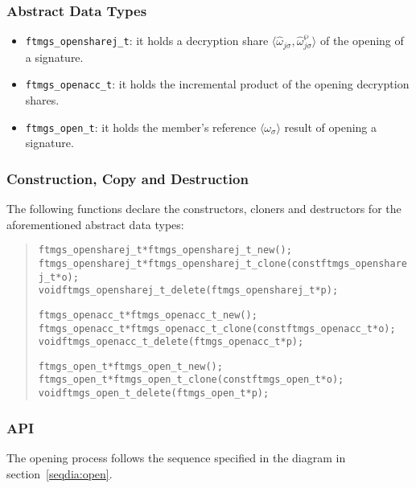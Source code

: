 \documentclass[a4paper]{article}
\newenvironment{code}%
{\begin{quote}\footnotesize\begin{alltt}}%
{\end{alltt}\end{quote}}%
\newcommand{\tuple}[1]{\ensuremath{\langle #1 \rangle}}
\begin{document}
\subsubsection*{Abstract Data Types}
\begin{itemize}\small
\item \verb|ftmgs_opensharej_t|: it holds a decryption share
  \tuple{\hat{\omega}_{j\sigma},\hat{\omega}^{\wp}_{j\sigma}} of the
  opening of a signature.
\item \verb|ftmgs_openacc_t|: it holds the incremental product of the
  opening decryption shares.
\item \verb|ftmgs_open_t|: it holds the member's reference
  \tuple{\omega_{\sigma}} result of opening a signature.
\end{itemize}
\subsubsection*{Construction, Copy and Destruction}
The following functions declare the constructors, cloners and destructors
for the aforementioned abstract data types:
\begin{code}
ftmgs_opensharej_t* ftmgs_opensharej_t_new();
ftmgs_opensharej_t* ftmgs_opensharej_t_clone(const ftmgs_opensharej_t* o);
void ftmgs_opensharej_t_delete(ftmgs_opensharej_t* p);

ftmgs_openacc_t* ftmgs_openacc_t_new();
ftmgs_openacc_t* ftmgs_openacc_t_clone(const ftmgs_openacc_t* o);
void ftmgs_openacc_t_delete(ftmgs_openacc_t* p);

ftmgs_open_t* ftmgs_open_t_new();
ftmgs_open_t* ftmgs_open_t_clone(const ftmgs_open_t* o);
void ftmgs_open_t_delete(ftmgs_open_t* p);
\end{code}
\subsubsection*{API}
The opening process follows the sequence specified in the diagram in
section~\ref{seqdia:open}.
\end{document}
